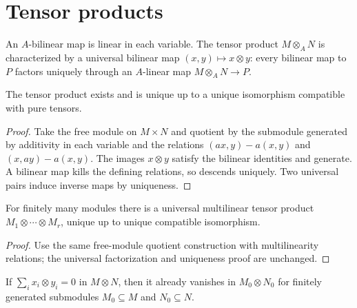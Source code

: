 \section{Tensor products}
\label{am-ch2-tensor}
\begin{definition}
\label{am-def-tensor}
\uses{}
An $A$-bilinear map is linear in each variable.  The tensor product $M\otimes_A N$
is characterized by a universal bilinear map $(x,y)\mapsto x\otimes y$:
every bilinear map to $P$ factors uniquely through an $A$-linear map
$M\otimes_A N\to P$.
\end{definition}
\begin{proposition}
\label{am-prop-2-12}
\uses{}
The tensor product exists and is unique up to a unique isomorphism compatible
with pure tensors.
\end{proposition}
\begin{proof}
Take the free module on $M\times N$ and quotient by the submodule generated
by additivity in each variable and the relations
$(ax,y)-a(x,y)$ and $(x,ay)-a(x,y)$.  The images $x\otimes y$ satisfy the
bilinear identities and generate.  A bilinear map kills the defining relations,
so descends uniquely.  Two universal pairs induce inverse maps by uniqueness.
\end{proof}
\begin{proposition}
\label{am-prop-2-12-star}
\uses{}
For finitely many modules there is a universal multilinear tensor product
$M_1\otimes\cdots\otimes M_r$, unique up to unique compatible isomorphism.
\end{proposition}
\begin{proof}
Use the same free-module quotient construction with multilinearity relations;
the universal factorization and uniqueness proof are unchanged.
\end{proof}
\begin{corollary}
\label{am-cor-2-13}
\uses{}
If $\sum_i x_i\otimes y_i=0$ in $M\otimes N$, then it already vanishes in
$M_0\otimes N_0$ for finitely generated submodules $M_0\subseteq M$ and
$N_0\subseteq N$.
\end{corollary}
